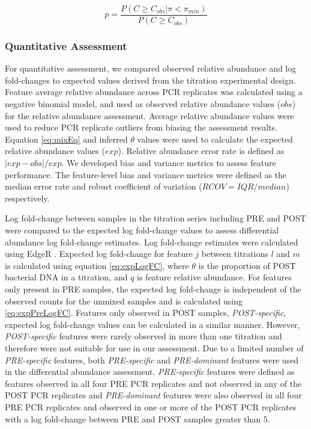 \documentclass[linenumbers]{bmcart}
\begin{document}
\begin{equation}
    p = \frac{P(C \geq C_{obs}| \pi < \pi_{min})}{P(C \geq C_{obs})}
  \label{eq:bht2}
\end{equation}



\subsubsection*{Quantitative Assessment}
For quantitative assessment, we compared observed relative abundance and
log fold-changes to expected values derived from the titration
experimental design.
Feature average relative abundance across PCR
replicates was calculated using a negative binomial model, and used as
observed relative abundance values (\(obs\)) for the relative abundance
assessment. Average relative abundance values were used to reduce PCR
replicate outliers from biasing the assessment results. Equation
\eqref{eq:mixEq} and inferred \(\theta\) values were used to calculate the
expected relative abundance values (\(exp\)). Relative abundance error
rate is defined as \(|exp - obs|/exp\).
We developed bias and variance metrics to assess feature performance.
The feature-level bias and variance metrics were defined as the median
error rate and robust coefficient of variation (\(RCOV=IQR/median\))
respectively.

Log fold-change between samples in the titration series including PRE
and POST were compared to the expected log fold-change values to assess
differential abundance log fold-change estimates. Log fold-change
estimates were calculated using EdgeR
\cite{Robinson2010, McCarthy2012}. Expected log fold-change for feature
\(j\) between titrations \(l\) and \(m\) is calculated using equation
\eqref{eq:expLogFC}, where \(\theta\) is the proportion of POST bacterial
DNA in a titration, and \(q\) is feature relative abundance. For
features only present in PRE samples, the expected log fold-change is
independent of the observed counts for the unmixed samples and is
calculated using \eqref{eq:expPreLogFC}. Features only observed in POST
samples, \emph{POST-specific}, expected log fold-change values can be
calculated in a similar manner. However, \emph{POST-specific} features
were rarely observed in more than one titration and therefore were not
suitable for use in our assessment. Due to a limited number of
\emph{PRE-specific} features, both \emph{PRE-specific} and
\emph{PRE-dominant} features were used in the differential abundance
assessment. \emph{PRE-specific} features were defined as features
observed in all four PRE PCR replicates and not observed in any of the
POST PCR replicates and \emph{PRE-dominant} features were also observed
in all four PRE PCR replicates and observed in one or more of the POST
PCR replicates with a log fold-change between PRE and POST samples
greater than 5.
\end{document}
